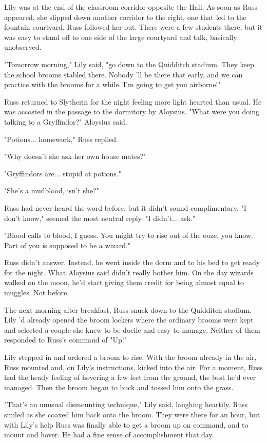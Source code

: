 \documentclass[a4paper,11pt]{article}
\begin{document}
Lily was at the end of the classroom corridor opposite the Hall. As soon as Russ appeared, she slipped down another corridor to the right, one that led to the fountain courtyard. Russ followed her out. There were a few students there, but it was easy to stand off to one side of the large courtyard and talk, basically unobserved.

"Tomorrow morning," Lily said, "go down to the Quidditch stadium. They keep the school brooms stabled there. Nobody 'll be there that early, and we can practice with the brooms for a while. I'm going to get you airborne!"

Russ returned to Slytherin for the night feeling more light hearted than usual. He was accosted in the passage to the dormitory by Aloysius. "What were you doing talking to a Gryffindor?" Aloysius said.

"Potions... homework," Russ replied.

"Why doesn't she ask her own house mates?"

"Gryffindors are... stupid at potions."

"She's a mudblood, isn't she?"

Russ had never heard the word before, but it didn't sound complimentary. "I don't know," seemed the most neutral reply. "I didn't... ask."

"Blood calls to blood, I guess. You might try to rise out of the ooze, you know. Part of you is supposed to be a wizard."

Russ didn't answer. Instead, he went inside the dorm and to his bed to get ready for the night. What Aloysius said didn't really bother him. On the day wizards walked on the moon, he'd start giving them credit for being almost equal to muggles. Not before.

The next morning after breakfast, Russ snuck down to the Quidditch stadium. Lily 'd already opened the broom lockers where the ordinary brooms were kept and selected a couple she knew to be docile and easy to manage. Neither of them responded to Russ's command of "Up!"

Lily stepped in and ordered a broom to rise. With the broom already in the air, Russ mounted and, on Lily's instructions, kicked into the air. For a moment, Russ had the heady feeling of hovering a few feet from the ground, the best he'd ever managed. Then the broom began to buck and tossed him onto the grass.

"That's an unusual dismounting technique," Lily said, laughing heartily. Russ smiled as she coaxed him back onto the broom. They were there for an hour, but with Lily's help Russ was finally able to get a broom up on command, and to mount and hover. He had a fine sense of accomplishment that day.
\end{document}
